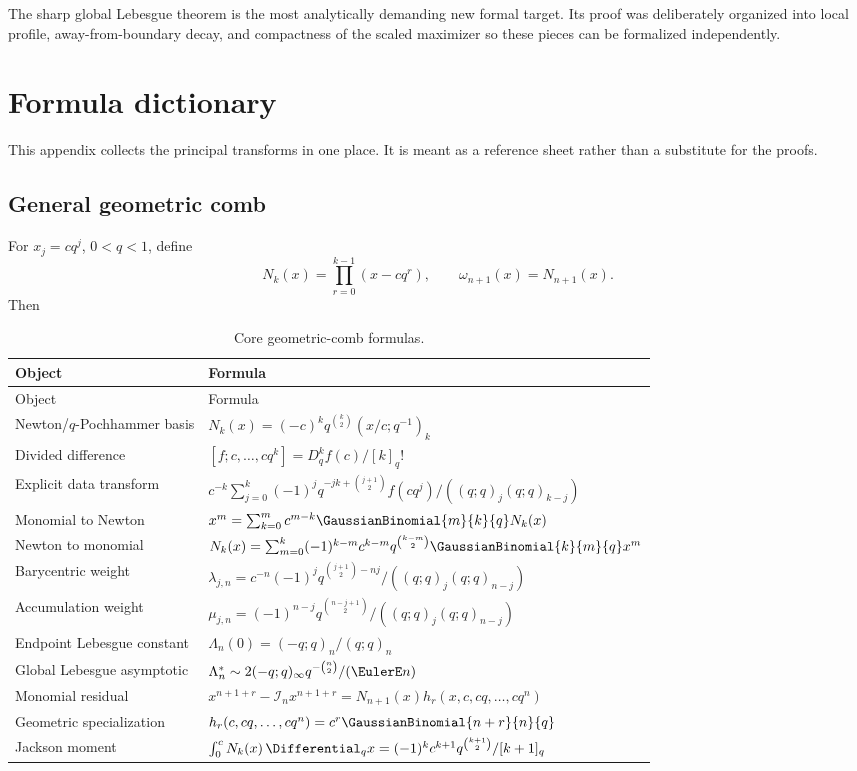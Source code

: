 \documentclass[11pt,oneside]{book}
\numberwithin{equation}{chapter}
\theoremstyle{definition}
\theoremstyle{remark}
\newcommand{\Interp}{\mathcal I}
\newcommand{\Leb}{\Lambda}
\begin{document}
The sharp global Lebesgue theorem is the most analytically demanding new
formal target.  Its proof was deliberately organized into local profile,
away-from-boundary decay, and compactness of the scaled maximizer so these
pieces can be formalized independently.

\appendix

\chapter{Formula dictionary}
\label{app:formula-dictionary}

This appendix collects the principal transforms in one place.  It is meant
as a reference sheet rather than a substitute for the proofs.

\section{General geometric comb}

For $x_j=cq^j$, $0<q<1$, define
\[
 N_k(x)=\prod_{r=0}^{k-1}(x-cq^r),
 \qquad
 \omega_{n+1}(x)=N_{n+1}(x).
\]
Then
\begin{longtable}{@{}p{}p{}@{}}
\caption{Core geometric-comb formulas.}\label{tab:formula-dictionary-general}\\
\toprule
Object & Formula\\
\midrule
\endfirsthead
\toprule
Object & Formula\\
\midrule
\endhead
Newton/$q$-Pochhammer basis
& $N_k(x)=(-c)^kq^{\binom k2}(x/c;q^{-1})_k$\\[4pt]
Divided difference
& $[f;c,\ldots,cq^k]=D_q^kf(c)/[k]_q!$\\[4pt]
Explicit data transform
& $c^{-k}\sum_{j=0}^k
 (-1)^jq^{-jk+\binom{j+1}{2}}f(cq^j)/
 ((q;q)_j(q;q)_{k-j})$\\[6pt]
Monomial to Newton
& $x^m=\sum_{k=0}^{m}c^{m-k}\GaussianBinomial{m}{k}{q}N_k(x)$\\[4pt]
Newton to monomial
& $N_k(x)=\sum_{m=0}^{k}(-1)^{k-m}c^{k-m}
 q^{\binom{k-m}{2}}\GaussianBinomial{k}{m}{q}x^m$\\[6pt]
Barycentric weight
& $\lambda_{j,n}=c^{-n}(-1)^jq^{\binom{j+1}{2}-nj}/
 ((q;q)_j(q;q)_{n-j})$\\[6pt]
Accumulation weight
& $\mu_{j,n}=(-1)^{n-j}q^{\binom{n-j+1}{2}}/
 ((q;q)_j(q;q)_{n-j})$\\[6pt]
Endpoint Lebesgue constant
& $\Leb_n(0)=(-q;q)_n/(q;q)_n$\\[4pt]
Global Lebesgue asymptotic
& $\Leb_n^*\sim2(-q;q)_\infty q^{-\binom n2}/(\EulerE n)$\\[4pt]
Monomial residual
& $x^{n+1+r}-\Interp_nx^{n+1+r}
 =N_{n+1}(x)h_r(x,c,cq,\ldots,cq^n)$\\[6pt]
Geometric specialization
& $h_r(c,cq,\ldots,cq^n)=c^r\GaussianBinomial{n+r}{n}{q}$\\[4pt]
Jackson moment
& $\int_0^cN_k(x)\,\Differential_qx=(-1)^kc^{k+1}
 q^{\binom{k+1}{2}}/[k+1]_q$\\
\bottomrule
\end{longtable}
\end{document}
